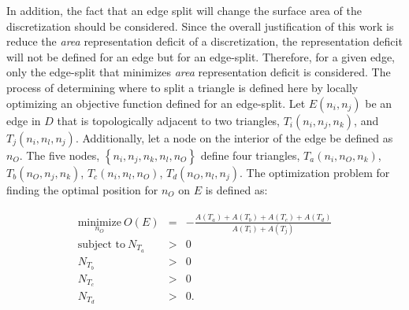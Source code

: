 In addition, the fact that an edge split will change the surface area of
the discretization should be considered. Since the overall justification
of this work is reduce the {\it area} representation deficit of a
discretization, the representation deficit will not be defined for an
edge but for an edge-split. Therefore, for a given edge, only the
edge-split that minimizes {\it area} representation deficit is
considered. The process of determining where to split a triangle is
defined here by locally optimizing an objective function defined for an
edge-split.  Let $E\left(n_i,n_j\right)$ be an edge in $D$ that is
topologically adjacent to two triangles, $T_i\left(n_i,n_j,n_k\right)$,
and $T_j\left(n_i,n_l,n_j\right)$. Additionally, let a node on the
interior of the edge be defined as $n_O$. The five nodes,
$\left\{n_i,n_j,n_k,n_l,n_O\right\}$ define four triangles,
$T_a\left(n_i,n_O,n_k\right)$, $T_b\left(n_O,n_j, n_k\right)$,
$T_c\left(n_i,n_l,n_O\right)$, $T_d\left(n_O,n_l,n_j\right)$.  The
optimization problem for finding the optimal position for $n_O$ on $E$
is defined as:

\begin{eqnarray*}
\begin{array}{rcl}
\underset{n_O}{\text{minimize}} \ O(E) & = & - \frac{ A\left(T_a\right) + A\left(T_b\right) + A\left(T_c\right) + A\left(T_d\right) }{ A\left(T_i\right) + A\left(T_j\right) } \\
\text{subject to} \ N_{T_a} & > & 0 \\
N_{T_b} & > & 0 \\ 
N_{T_c} & > & 0 \\
N_{T_d} & > & 0. \\
\end{array}
\end{eqnarray*}
